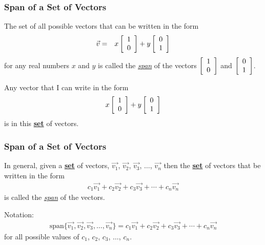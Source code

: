 \begin{frame}
  \frametitle{Span of a Set of Vectors}

  {\color{brown}The set} of all possible vectors 
  that can be written in the form
  \begin{eqnarray*}
    \vec{v} & = & x \left[ \begin{array}{r} 1 \\ 0 \end{array} \right] + y \left[ \begin{array}{r} 0 \\ 1 \end{array} \right]
  \end{eqnarray*}
  for any real numbers $x$ and $y$ is called  
  {the \color{red}\textit{\underline{span}} of the
  vectors $\left[ \begin{array}{r} 1 \\ 0 \end{array} \right]$ and $\left[ \begin{array}{r} 0 \\ 1 \end{array} \right]$}. 

  \vfill

  {
    Any vector that I can write in the form
    \begin{eqnarray*}
      x \left[ \begin{array}{r} 1 \\ 0 \end{array} \right] + y \left[ \begin{array}{r} 0 \\ 1 \end{array} \right]
    \end{eqnarray*}
    is in this \textbf{\underline{set}} of vectors.
  }

\end{frame}


\begin{frame}
  \frametitle{Span of a Set of Vectors}

  In general, given a \textbf{\underline{set}} of vectors, $\vec{v_1}$, $\vec{v_2}$, $\vec{v_3}$,
  $\ldots$, $\vec{v_n}$ then the \textbf{\underline{set}} of vectors
  that  be written in the form
  \begin{eqnarray*}
    c_1 \vec{v_1} + c_2 \vec{v_2} + c_3 \vec{v_3} + \cdots + c_n \vec{v_n}
  \end{eqnarray*}
  is called {\color{red}the \textit{\underline{span}} of the vectors.}

  {
    Notation:
    {\color{blue}
     \begin{eqnarray*}
      \mathrm{span}\{\vec{v_1}, \vec{v_2}, \vec{v_3},\ldots, \vec{v_n} \}
    = c_1 \vec{v_1} + c_2 \vec{v_2} + c_3 \vec{v_3} + \cdots + c_n \vec{v_n}
    \end{eqnarray*}
    for all possible values of $c_1$, $c_2$, $c_3$, $\ldots$, $c_n$.
    }
  }

\end{frame}


